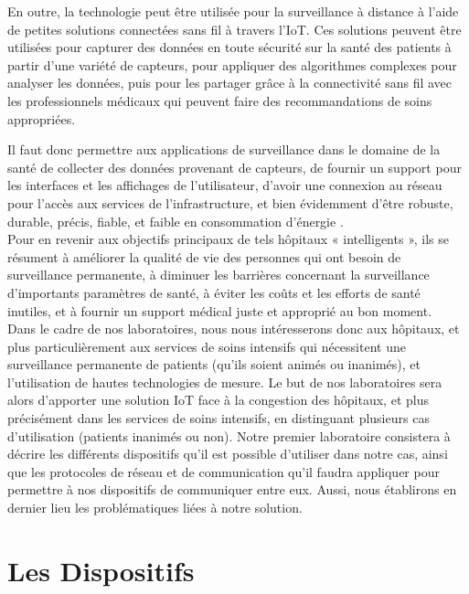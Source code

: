 \documentclass{article}
\begin{document}
En outre, la technologie peut être utilisée pour la surveillance à distance à l'aide de petites solutions connectées sans fil à travers l'IoT. Ces solutions peuvent être utilisées pour capturer des données en toute sécurité sur la santé des patients à partir d'une variété de capteurs, pour appliquer des algorithmes complexes pour analyser les données, puis pour les partager grâce à la connectivité sans fil avec les professionnels médicaux qui peuvent faire des recommandations de soins appropriées.

Il faut donc permettre aux applications de surveillance dans le domaine de la santé de collecter des données provenant de capteurs, de fournir un support pour les interfaces et les affichages de l’utilisateur, d’avoir une connexion au réseau pour l’accès aux services de l’infrastructure, et bien évidemment d’être robuste, durable, précis, fiable, et faible en consommation d’énergie \cite{vermesan2014internet}.
\\

Pour en revenir aux objectifs principaux de tels hôpitaux « intelligents », ils se résument à améliorer la qualité de vie des personnes qui ont besoin de surveillance permanente, à diminuer les barrières concernant la surveillance d’importants paramètres de santé, à éviter les coûts et les efforts de santé inutiles, et à fournir un support médical juste et approprié au bon moment.
\\

Dans le cadre de nos laboratoires, nous nous intéresserons donc aux hôpitaux, et plus particulièrement aux services de soins intensifs qui nécessitent une surveillance permanente de patients (qu’ils soient animés ou inanimés), et l’utilisation de hautes technologies de mesure. Le but de nos laboratoires sera alors d’apporter une solution IoT face à la congestion des hôpitaux, et plus précisément dans les services de soins intensifs, en distinguant plusieurs cas d’utilisation (patients inanimés ou non). Notre premier laboratoire consistera à décrire les différents dispositifs qu’il est possible d’utiliser dans notre cas, ainsi que les protocoles de réseau et de communication qu’il faudra appliquer pour permettre à nos dispositifs de communiquer entre eux. Aussi, nous établirons en dernier lieu les problématiques liées à notre solution. 

\section{Les Dispositifs}
\end{document}
